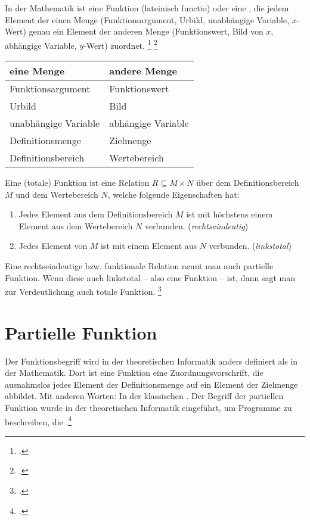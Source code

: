 \documentclass{lehramt-informatik-haupt}
\begin{document}
In der Mathematik ist eine Funktion (lateinisch functio) oder
 eine , die jedem Element der einen Menge (Funktionsargument, Urbild,
unabhängige Variable, $x$-Wert) genau ein Element der anderen Menge
(Funktionswert, Bild von $x$, abhängige Variable, $y$-Wert) zuordnet.
\footcite[Seite 51]{hoffmann}
\footcite{wiki:funktion}

\begin{center}
\begin{tabular}{l|l}
eine Menge & andere Menge\\\hline
Funktionsargument & Funktionswert\\
Urbild & Bild\\
unabhängige Variable & abhängige Variable\\
Definitionsmenge & Zielmenge\\
Definitionsbereich & Wertebereich\\
\end{tabular}
\end{center}

Eine (totale) Funktion ist eine Relation $R \subseteq M \times N$ über
dem Deﬁnitionsbereich $M$ und dem Wertebereich $N$, welche folgende
Eigenschaften hat:

\begin{enumerate}
\item Jedes Element aus dem Deﬁnitionsbereich $M$ ist mit höchstens
einem Element aus dem Wertebereich $N$ verbunden. (\emph{rechtseindeutig})

\item Jedes Element von $M$ ist mit einem Element aus $N$ verbunden.
(\emph{linkstotal})
\end{enumerate}

\begin{liExkurs}
Eine rechtseindeutige bzw. funktionale Relation nennt man auch partielle
Funktion. Wenn diese auch linkstotal – also eine Funktion – ist, dann
sagt man zur Verdeutlichung auch totale Funktion.
\footcite{wiki:relation}
\end{liExkurs}

\section{Partielle Funktion}

Der Funktionsbegriff wird in der theoretischen Informatik anders
definiert als in der Mathematik. Dort ist eine Funktion eine
Zuordnungsvorschrift, die ausnahmslos jedes Element der Definitionsmenge
auf ein Element der Zielmenge abbildet. Mit anderen Worten: In der
klassischen . Der Begriff
der partiellen Funktion wurde in der theoretischen Informatik
eingeführt, um Programme zu beschreiben, die .\footcite[Seite 51]{hoffmann}
\end{document}
